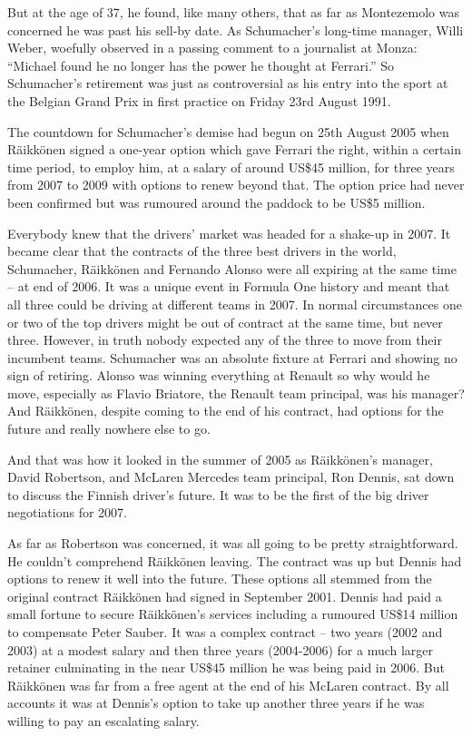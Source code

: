 \documentclass{article}
\begin{document}
But at the age of 37, he found, like many others, that as far as Montezemolo was concerned he was past his sell-by date. As Schumacher’s long-time manager, Willi Weber, woefully observed in a passing comment to a journalist at Monza: “Michael found he no longer has the power he thought at Ferrari.” So Schumacher’s retirement was just as controversial as his entry into the sport at the Belgian Grand Prix in first practice on Friday 23rd August 1991.

The countdown for Schumacher’s demise had begun on 25th August 2005 when Räikkönen signed a one-year option which gave Ferrari the right, within a certain time period, to employ him, at a salary of around US\$45 million, for three years from 2007 to 2009 with options to renew beyond that. The option price had never been confirmed but was rumoured around the paddock to be US\$5 million.

Everybody knew that the drivers’ market was headed for a shake-up in 2007. It became clear that the contracts of the three best drivers in the world, Schumacher, Räikkönen and Fernando Alonso were all expiring at the same time – at end of 2006. It was a unique event in Formula One history and meant that all three could be driving at different teams in 2007. In normal circumstances one or two of the top drivers might be out of contract at the same time, but never three. However, in truth nobody expected any of the three to move from their incumbent teams. Schumacher was an absolute fixture at Ferrari and showing no sign of retiring. Alonso was winning everything at Renault so why would he move, especially as Flavio Briatore, the Renault team principal, was his manager? And Räikkönen, despite coming to the end of his contract, had options for the future and really nowhere else to go.

And that was how it looked in the summer of 2005 as Räikkönen’s manager, David Robertson, and McLaren Mercedes team principal, Ron Dennis, sat down to discuss the Finnish driver’s future. It was to be the first of the big driver negotiations for 2007.

As far as Robertson was concerned, it was all going to be pretty straightforward. He couldn’t comprehend Räikkönen leaving. The contract was up but Dennis had options to renew it well into the future. These options all stemmed from the original contract Räikkönen had signed in September 2001. Dennis had paid a small fortune to secure Räikkönen’s services including a rumoured US\$14 million to compensate Peter Sauber. It was a complex contract – two years (2002 and 2003) at a modest salary and then three years (2004-2006) for a much larger retainer culminating in the near US\$45 million he was being paid in 2006. But Räikkönen was far from a free agent at the end of his McLaren contract. By all accounts it was at Dennis’s option to take up another three years if he was willing to pay an escalating salary.
\end{document}

